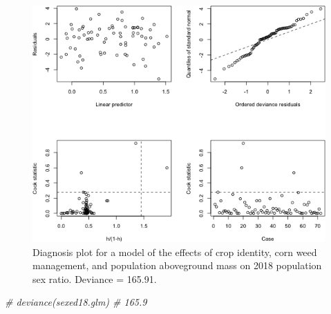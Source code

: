 \documentclass[
]{article}
\newenvironment{Shaded}{\begin{snugshade}}{\end{snugshade}}
\newcommand{\CommentTok}[1]{\textcolor[rgb]{0.56,0.35,0.01}{\textit{#1}}}
\begin{document}
\begin{figure}
\includegraphics[width=1\linewidth]{AppendixC_model_diagnosis_files/figure-latex/sexr18-1} \caption{Diagnosis plot for a model of the effects of crop identity, corn weed management, and population aboveground mass on 2018 population sex ratio. Deviance = 165.91.}\label{fig:sexr18}
\end{figure}

\begin{Shaded}
\begin{Highlighting}[]
\CommentTok{\# deviance(sexed18.glm) \# 165.9}
\end{Highlighting}
\end{Shaded}
\end{document}
